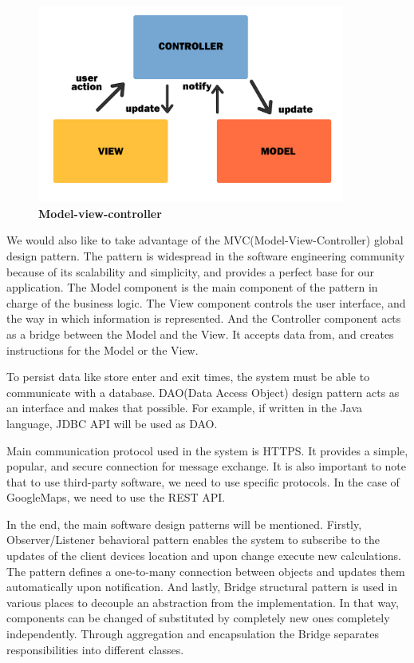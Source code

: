  

\begin{figure}[!h]
\centering
\includegraphics[width=0.9\textwidth]{Images/MVC}
\caption{\label{fig:mvc}\textbf{Model-view-controller}}
\end{figure} \newpage

 

We would also like to take advantage of the MVC(Model-View-Controller) global design pattern. The pattern is widespread in the software engineering community because of its scalability and simplicity, and provides a perfect base for our application. The Model component is the main component of the pattern in charge of the business logic. The View component controls the user interface, and the way in which information is represented. And the Controller component acts as a bridge between the Model and the View. It accepts data from, and creates instructions for the Model or the View. \newline


To persist data like store enter and exit times, the system must be able to communicate with a database. DAO(Data Access Object) design pattern acts as an interface and makes that possible. For example, if written in the Java language, JDBC API will be used as DAO. 

 

Main communication protocol used in the system is HTTPS. It provides a simple, popular, and secure connection for message exchange. It is also important to note that to use third-party software, we need to use specific protocols. In the case of GoogleMaps, we need to use the REST API. \newline

 

In the end, the main software design patterns will be mentioned. Firstly, Observer/Listener behavioral pattern enables the system to subscribe to the updates of the client devices location and upon change execute new calculations. The pattern defines a one-to-many connection between objects and updates them automatically upon notification. And lastly, Bridge structural pattern is used in various places to decouple an abstraction from the implementation. In that way, components can be changed of substituted by completely new ones completely independently. Through aggregation and encapsulation the Bridge separates responsibilities into different classes. 
\newpage
